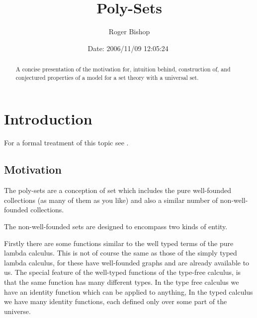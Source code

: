 \documentclass[numreferences]{rbjk}
\begin{document}
                                                                                   
\begin{article}
\begin{opening}  
\title{Poly-Sets}
\author{Roger Bishop }
\date{$ $Date: 2006/11/09 12:05:24 $ $}

\begin{abstract}
A concise presentation of the motivation for, intuition behind, construction of, and conjectured properties of a model for a set theory with a universal set.
\end{abstract}
\end{opening}

\setcounter{tocdepth}{4}
{\parskip-0pt\tableofcontents}

\section{Introduction}

For a formal treatment of this topic see \cite{rbjt020}.

\subsection{Motivation}

The poly-sets are a conception of set which includes the pure well-founded collections (as many of them as you like) and also a similar number of non-well-founded collections.

The non-well-founded sets are designed to encompass two kinds of entity.

Firstly there are some functions similar to the well typed terms of the pure lambda calculus.
This is not of course the same as those of the simply typed lambda calculus, for these have well-founded graphs and are already available to us.
The special feature of the well-typed functions of the type-free calculus, is that the same function has many different types.
In the type free calculus we have an identity function which can be applied to anything,
In the typed calculus we have many identity functions, each defined only over some part of the universe.


\end{article}
\end{document}

